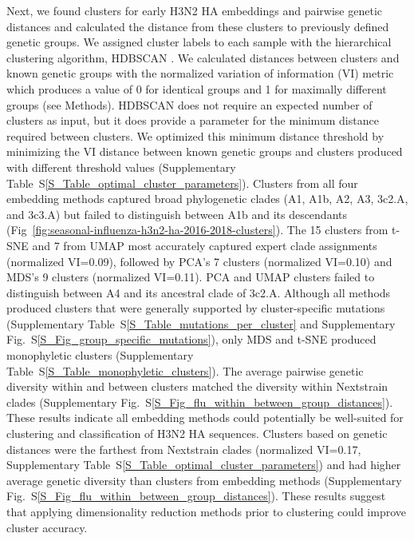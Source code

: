 \documentclass[webpdf,contemporary,large,single]{oup-authoring-template}%
\theoremstyle{thmstyleone}%
\theoremstyle{thmstyletwo}%
\theoremstyle{thmstylethree}%
\begin{document}
Next, we found clusters for early H3N2 HA embeddings and pairwise genetic distances and calculated the distance from these clusters to previously defined genetic groups.
We assigned cluster labels to each sample with the hierarchical clustering algorithm, HDBSCAN \citep{campello2015hierarchical}.
We calculated distances between clusters and known genetic groups with the normalized variation of information (VI) metric \citep{meilua2003comparing} which produces a value of 0 for identical groups and 1 for maximally different groups (see Methods).
HDBSCAN does not require an expected number of clusters as input, but it does provide a parameter for the minimum distance required between clusters.
We optimized this minimum distance threshold by minimizing the VI distance between known genetic groups and clusters produced with different threshold values (Supplementary Table~S\ref{S_Table_optimal_cluster_parameters}).
Clusters from all four embedding methods captured broad phylogenetic clades (A1, A1b, A2, A3, 3c2.A, and 3c3.A) but failed to distinguish between A1b and its descendants (Fig~\ref{fig:seasonal-influenza-h3n2-ha-2016-2018-clusters}).
The 15 clusters from t-SNE and 7 from UMAP most accurately captured expert clade assignments (normalized VI=0.09), followed by PCA's 7 clusters (normalized VI=0.10) and MDS's 9 clusters (normalized VI=0.11).
PCA and UMAP clusters failed to distinguish between A4 and its ancestral clade of 3c2.A.
Although all methods produced clusters that were generally supported by cluster-specific mutations (Supplementary Table~S\ref{S_Table_mutations_per_cluster} and Supplementary Fig.~S\ref{S_Fig_group_specific_mutations}), only MDS and t-SNE produced monophyletic clusters (Supplementary Table~S\ref{S_Table_monophyletic_clusters}).
The average pairwise genetic diversity within and between clusters matched the diversity within Nextstrain clades (Supplementary Fig.~S\ref{S_Fig_flu_within_between_group_distances}).
These results indicate all embedding methods could potentially be well-suited for clustering and classification of H3N2 HA sequences.
Clusters based on genetic distances were the farthest from Nextstrain clades (normalized VI=0.17, Supplementary Table~S\ref{S_Table_optimal_cluster_parameters}) and had higher average genetic diversity than clusters from embedding methods (Supplementary Fig.~S\ref{S_Fig_flu_within_between_group_distances}).
These results suggest that applying dimensionality reduction methods prior to clustering could improve cluster accuracy.
\end{document}
